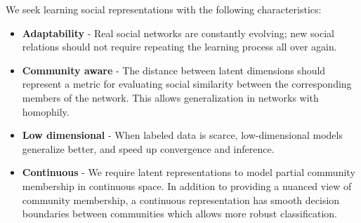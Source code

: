 \documentclass{sig-alternate}
\begin{document}
We seek learning social representations with the following characteristics:
\begin{itemize}
\item \textbf{Adaptability} - Real social networks are constantly evolving;  new social relations should not require repeating the learning process all over again.


\item \textbf{Community aware} - The distance between latent dimensions should represent a metric for evaluating social similarity between the corresponding members of the network.
This allows generalization in networks with homophily.




\item \textbf{Low dimensional} - When labeled data is scarce, low-dimensional models generalize better, and speed up convergence and inference.

\item \textbf{Continuous} - 
We require latent representations to model partial community membership in continuous space.
In addition to providing a nuanced view of community membership, a continuous representation has smooth decision boundaries between communities which allows more robust classification.



\end{itemize}
\end{document}
